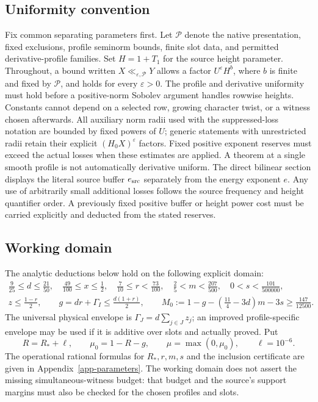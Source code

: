 \documentclass[11pt]{article}
\theoremstyle{definition}
\newcommand{\eps}{\varepsilon}
\newcommand{\lls}{\ll_{\eps,\mathcal P}}
\begin{document}
\subsection{Uniformity convention}
Fix common separating parameters first. Let $\mathcal P$ denote the native presentation, fixed exclusions, profile seminorm bounds, finite slot data, and permitted derivative-profile families. Set $H=1+T_1$ for the source height parameter. Throughout, a bound written $X\lls Y$ allows a factor $U^\eps H^b$, where $b$ is finite and fixed by $\mathcal P$, and holds for every $\eps>0$. The profile and derivative uniformity must hold before a positive-norm Sobolev argument handles rowwise heights. Constants cannot depend on a selected row, growing character twist, or a witness chosen afterwards. All auxiliary norm radii used with the suppressed-loss notation are bounded by fixed powers of $U$; generic statements with unrestricted radii retain their explicit $(H_0X)^\eps$ factors. Fixed positive exponent reserves must exceed the actual losses when these estimates are applied. A theorem at a single smooth profile is not automatically derivative uniform. The direct bilinear section displays the literal source buffer $e_{\rm src}$ separately from the energy exponent $e$. Any use of arbitrarily small additional losses follows the source frequency and height quantifier order. A previously fixed positive buffer or height power cost must be carried explicitly and deducted from the stated reserves.

\subsection{Working domain}
The analytic deductions below hold on the following explicit domain:
\begin{gather}\label{eq-working-domain}
 \frac9{25}\le d\le\frac{21}{50},\quad
 \frac{49}{100}\le x\le\frac12,\quad
 \frac7{10}\le r<\frac{73}{100},\quad
 \frac25<m<\frac{207}{500},\quad
 0<s<\frac{101}{500000},\\
 z\le\frac{1-r}{2},\qquad
 g=dr+\Gamma_I\le\frac{d(1+r)}2,\qquad
 M_0:=1-g-(\tfrac{11}{4}-3d)m-3s\ge\frac{147}{12500}.\label{eq-working-margin}
\end{gather}
The universal physical envelope is $\Gamma_J=d\sum_{j\in J}z_j$; an improved profile-specific envelope may be used if it is additive over slots and actually proved. Put
\[
 R=R_*+\ell,\qquad \mu_0=1-R-g,\qquad
 \mu=\max(0,\mu_0),\qquad \ell=10^{-6}.
\]
The operational rational formulas for $R_*,r,m,s$ and the inclusion certificate are given in Appendix~\ref{app-parameters}. The working domain does not assert the missing simultaneous-witness budget: that budget and the source's support margins must also be checked for the chosen profiles and slots.
\end{document}
